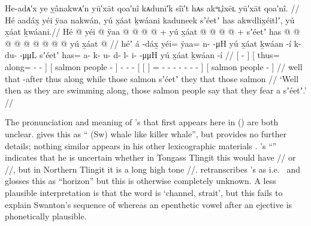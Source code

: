 \ex\label{ex:100-84-prepared-to-go}%
%
\begingl
	\glpreamble	He-adᴀ′x ye ỵânakwᴀ′n yū′xāt qoa′nî kᴀdunī′k sîī′t hᴀs akᵘʟ̣îxēʟ yū′xāt qoa′nî. //
	\glpreamble	Hé aadáx̱ yéi ÿaa nakwán, yú x̱áat ḵwáani kaduneek sʼéetʼ has akwdlix̱éitlʼ,
				yú x̱áat ḵwáani.//
	\gla	Hé 
		{}  @ {} {} 
		{} yéi @ ÿaa @  @ {} @ {} @ {} {} +
		{} yú x̱áat  @ {} {}
		 @ {} @ {} @ {} +
		{} {} sʼéetʼ {}
			has @  @ {} @ {} @ {} @ {} @ {} @ {} @ {} @ {} {}
		{} yú x̱áat  @ {} {} //
	\glb	héʼ 
		{} á -dáx̱ {} 
		{} yéi= ÿaa= n-  -μH {} {} 
		{} yú x̱áat ḵwáan -í {}
		k- du-  -μμL 
		{} {} sʼéetʼ {} 
			has= a- k- u- d- l- i-  -μμH {} {}
		{} yú x̱áat ḵwáan -í {} //
	\glc	{} 
		{}[  - {}]
		{}[ thus= along= -  - \· {}]
		{}[  salmon people - {}]
		- -  -
		{}[ {}[  {}]
			= - - - - - -  - \· {}]
		{}[  salmon people - {}] //
	\gld	well 
		{} that -after {}
		{} thus along  {} {} \·while {}
		{} those salmon  {} {}
		 {} {} {}
		{} {} sʼéetʼ {}
			they  {} {} {} {} {} {} {} \·that {}
		{} those salmon  {} {} //
	\glft	‘Well then as they are swimming along, those salmon people say that they fear a sʼéetʼ.’
		//
\endgl
\xe

The pronunciation and meaning of \citeauthor{swanton:1909}’s  that first appears here in (\lastx) are both unclear.
\textcite[43]{leer:1978b} gives this as “ (Sw) whale like killer whale”, but provides no further details; nothing similar appears in his other lexicographic materials \parencites{leer:1973}{leer:1976}.
\citeauthor{leer:1978b}’s “\!” indicates that he is uncertain whether in Tongass Tlingit this would have // or //, but in Northern Tlingit it is a long high tone //.
\textcite[125]{boas:1917} retranscribes \citeauthor{swanton:1909}’s  as  i.e.\  and glosses this as “horizon” but this is otherwise completely unknown.
A less plausible interpretation is that the word is  ‘channel, strait’, but this fails to explain Swanton’s sequence of  whereas an epenthetic vowel after an ejective is phonetically plausible.

